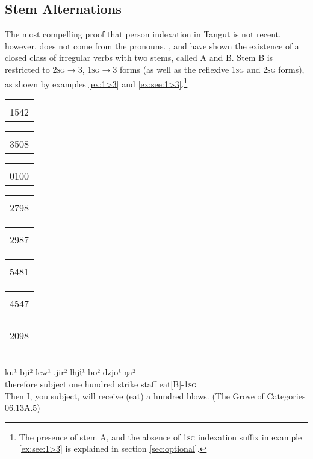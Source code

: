 \documentclass[oldfontcommands,oneside,a4paper,11pt]{article}
\newcommand{\ipa}[1]{{\phon \mbox{#1}}} %
\newcommand{\bleu}[1]{{\color{blue}#1}}
\newcommand{\tgf}[1]{\begin{tabular}{l}\mo{#1}\\{\tiny #1}\end{tabular}}
\begin{document}


\subsection{Stem Alternations}
The most compelling proof that person indexation in Tangut is not recent, however, does not come from the pronouns. \citet{gong01huying}, \citet{jacques09tangutverb} and \citet{jacques14esquisse} have shown the existence of a closed class of irregular verbs with two stems, called A and B. Stem B is restricted to \textsc{2sg}$\rightarrow$3, \textsc{1sg}$\rightarrow$3 forms (as well as the reflexive \textsc{1sg} and \textsc{2sg} forms), as shown by examples \ref{ex:1>3} and \ref{ex:see:1>3}.\footnote{The presence of stem A, and the absence of \textsc{1sg} indexation suffix in example \ref{ex:see:1>3} is explained in section \ref{sec:optional}.}

\begin{exe}
\ex \label{ex:1>3}
\glll
\tgf{1542}	\tgf{3508}	\tgf{0100}	\tgf{2798}	\tgf{2987}	\tgf{5481}	\tgf{4547}\tgf{2098}\\
   \ipa{ku¹}	\ipa{bji²}	\ipa{lew¹}	\ipa{.jir²}	\ipa{lhjɨ̣¹}	\ipa{bo²}	\ipa{dzjo¹-ŋa²} \\
therefore subject one hundred strike staff \bleu{eat[B]-\textsc{1sg}} \\
\glt Then I, you subject, will receive (eat) a hundred blows.  (The Grove of Categories 06.13A.5)
\end{exe}
\end{document}
